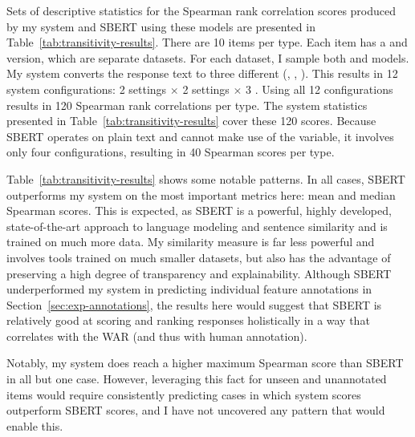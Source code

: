 Sets of descriptive statistics for the Spearman rank correlation scores produced by my system and SBERT using these models are presented in Table~\ref{tab:transitivity-results}. There are 10 items per type. Each item has a  and  version, which are separate datasets. For each dataset, I sample both  and  models. My system converts the response text to three different  (, , ). This results in 12 system configurations: 2  settings $\times$ 2  settings $\times$ 3 . Using all 12 configurations results in 120 Spearman rank correlations per  type. The system statistics presented in Table~\ref{tab:transitivity-results} cover these 120 scores. Because SBERT operates on plain text and cannot make use of the  variable, it involves only four configurations, resulting in 40 Spearman scores per  type.

Table~\ref{tab:transitivity-results} shows some notable patterns. In all cases, SBERT outperforms my system on the most important metrics here: mean and median Spearman scores. This is expected, as SBERT is a powerful, highly developed, state-of-the-art approach to language modeling and sentence similarity and is trained on much more data. My similarity measure is far less powerful and involves tools trained on much smaller datasets, but also has the advantage of preserving a high degree of transparency and explainability. Although SBERT underperformed my system in predicting individual feature annotations in Section~\ref{sec:exp-annotations}, the results here would suggest that SBERT is relatively good at scoring and ranking responses holistically in a way that correlates with the WAR (and thus with human annotation).

Notably, my system does reach a higher maximum Spearman score than SBERT in all but one case. However, leveraging this fact for unseen and unannotated items would require consistently predicting cases in which system scores outperform SBERT scores, and I have not uncovered any pattern that would enable this.


